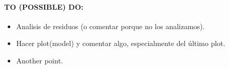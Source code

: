 \documentclass[10pt]{article}
\begin{document}
\paragraph*{TO (POSSIBLE) DO:}
\begin{itemize}
	\item Analisis de residuos (o comentar porque no los analizamos).
	\item Hacer plot(model) y comentar algo, especialmente del último plot.
	\item Another point.
\end{itemize}
\end{document}
